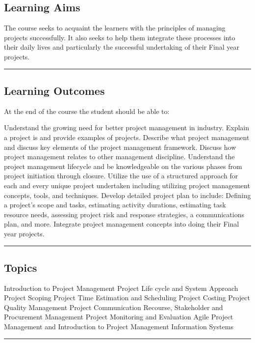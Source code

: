 \subsection*{Learning Aims}
The course seeks to acquaint the learners with the principles of managing projects successfully.
It also seeks to help them integrate these processes into their daily lives and particularly the successful undertaking of their Final year projects.
\vspace{2ex}\hrule\vspace{2ex}

\subsection*{Learning Outcomes}
At the end of the course the student should be able to:
\begin{outline}
    \1 Understand the growing need for better project management in industry.
    \1 Explain a project is and provide examples of projects.
    \1 Describe what project management and discuss key elements of the project management framework.
    \1 Discuss how project management relates to other management discipline.
    \1 Understand the project management lifecycle and be knowledgeable on the various phases from project initiation through closure.
    \1 Utilize the use of a structured approach for each and every unique project undertaken including utilizing project management concepts, tools, and techniques.
    \1 Develop detailed project plan to include: Defining a project’s scope and tasks, estimating  activity durations, estimating task resource needs, assessing project risk and response strategies, a communications plan, and more.
    \1 Integrate project management concepts into doing their Final year projects.
\end{outline}
\vspace{2ex}\hrule\vspace{2ex}


\subsection*{Topics}
\begin{outline}
    \1 Introduction to Project Management
    \1 Project Life cycle and System Approach
    \1 Project Scoping
    \1 Project Time Estimation and Scheduling
    \1 Project Costing
    \1 Project Quality Management
    \1 Project Communication Recourse, Stakeholder and Procurement Management
    \1 Project Monitoring and Evaluation
    \1 Agile Project Management and Introduction to Project Management Information Systems
\end{outline}
\vspace{2ex} \hrule\vspace{2ex}

